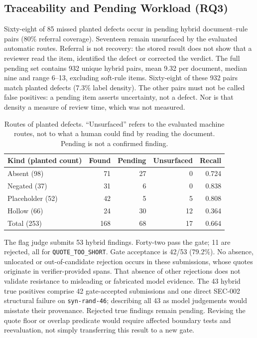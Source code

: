 \documentclass[computers,article,submit,moreauthors]{Definitions/mdpi}
\begin{document}
\subsection{Traceability and Pending Workload (RQ3)}\label{sec:misses}

Sixty-eight of 85 missed planted defects occur in pending hybrid document--rule pairs (80\% referral coverage). Seventeen remain unsurfaced by the evaluated automatic routes. Referral is not recovery: the stored result does not show that a reviewer read the item, identified the defect or corrected the verdict. The full pending set contains 932 unique hybrid pairs, mean 9.32 per document, median nine and range 6--13, excluding soft-rule items. Sixty-eight of these 932 pairs match planted defects (7.3\% label density). The other pairs must not be called false positives: a pending item asserts uncertainty, not a defect. Nor is that density a measure of review time, which was not measured.

\begin{table}[!ht]
\caption{Routes of planted defects. ``Unsurfaced'' refers to the evaluated machine routes, not to what a human could find by reading the document. Pending is not a confirmed finding.}
\label{tab:kinds}
\centering\footnotesize
\begin{tabular}{@{}lrrrr@{}}
\toprule
Kind (planted count) & Found & Pending & Unsurfaced & Recall \\
\midrule
Absent (98) & 71 & 27 & 0 & 0.724 \\
Negated (37) & 31 & 6 & 0 & 0.838 \\
Placeholder (52) & 42 & 5 & 5 & 0.808 \\
Hollow (66) & 24 & 30 & 12 & 0.364 \\
\midrule
Total (253) & 168 & 68 & 17 & 0.664 \\
\bottomrule
\end{tabular}
\end{table}

The flag judge submits 53 hybrid findings. Forty-two pass the gate; 11 are rejected, all for \texttt{QUOTE\_TOO\_SHORT}. Gate acceptance is 42/53 (79.2\%). No absence, unlocated or out-of-candidate rejection occurs in these submissions, whose quotes originate in verifier-provided spans. That absence of other rejections does not validate resistance to misleading or fabricated model evidence. The 43 hybrid true positives comprise 42 gate-accepted submissions and one direct SEC-002 structural failure on \texttt{syn-rand-46}; describing all 43 as model judgements would misstate their provenance. Rejected true findings remain pending. Revising the quote floor or overlap predicate would require affected boundary tests and reevaluation, not simply transferring this result to a new gate.
\end{document}
